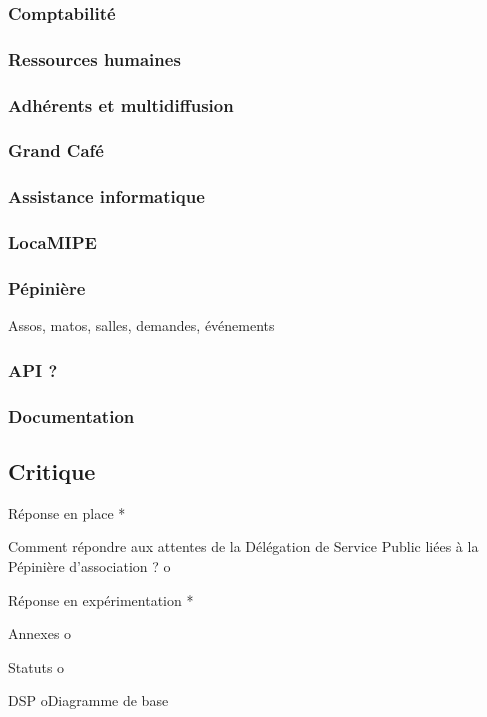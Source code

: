 \documentclass[a4wide,10pt,2pages]{article}
\begin{document}
\subsubsection{Comptabilité}
\subsubsection{Ressources humaines}
\subsubsection{Adhérents et multidiffusion}
\subsubsection{Grand Café}
\subsubsection{Assistance informatique}
\subsubsection{LocaMIPE}
\subsubsection{Pépinière}
Assos, matos, salles, demandes, événements
\subsubsection{API ?}
\subsubsection{Documentation}
\subsection{Critique}

            Réponse en place
    *

      Comment répondre aux attentes de la Délégation de Service Public liées à la Pépinière d'association ?
          o

            Réponse en expérimentation
    *

      Annexes
          o

            Statuts
          o

            DSP
          oDiagramme de base
\end{document}

